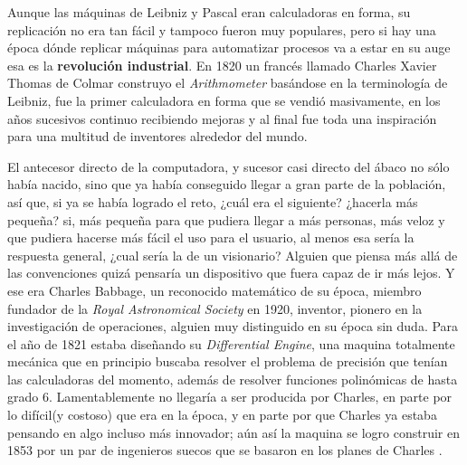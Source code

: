 \documentclass[letterpaper,12pt,oneside]{book}
\begin{document}
		Aunque las máquinas de Leibniz y Pascal eran calculadoras en forma, su replicación no era tan fácil y tampoco fueron muy populares, pero
		si hay una época dónde replicar máquinas para automatizar procesos va a estar en su auge esa es la \textbf{revolución industrial}. En
		1820 un francés llamado Charles Xavier Thomas de Colmar construyo el \textit{Arithmometer} basándose en la terminología de Leibniz, fue la primer
		calculadora en forma que se vendió masivamente, en los años sucesivos continuo recibiendo mejoras y al final fue toda una inspiración para una multitud de inventores 
		alrededor del mundo\cite[p. 127]{ifrah_universal_2001}.
		
		El antecesor directo de la computadora, y sucesor casi directo del ábaco no sólo había nacido, sino que ya había conseguido llegar a gran parte de
		la población, así que, si ya se había logrado el reto, ¿cuál era el siguiente? ¿hacerla más pequeña? si, más pequeña para que pudiera llegar a más personas,
		más veloz y que pudiera hacerse más fácil el uso para el usuario, al menos esa sería la respuesta general, ¿cual sería la de un visionario? Alguien
		que piensa más allá de las convenciones quizá pensaría un dispositivo que fuera capaz de ir más lejos. Y ese era Charles 
		Babbage,
		un reconocido matemático de su época, miembro fundador de la \textit{Royal Astronomical Society} en 1920, inventor, pionero en la investigación
		de operaciones, alguien muy distinguido en su época sin duda. Para el año de 1821 estaba diseñando su \textit{Differential Engine}, una maquina totalmente mecánica que
		en principio buscaba resolver el problema de precisión que tenían las calculadoras del momento, además de resolver funciones polinómicas de hasta
		grado 6. Lamentablemente no llegaría a ser producida por Charles, en parte por lo difícil(y costoso) que era en la época, y en parte por que Charles ya estaba pensando 
		en algo incluso más innovador; aún así la maquina se logro construir en 1853 por un par de ingenieros suecos que se basaron en los planes de Charles
		\cite[p.201]{oregan_brief_2012}.
		
\end{document}
